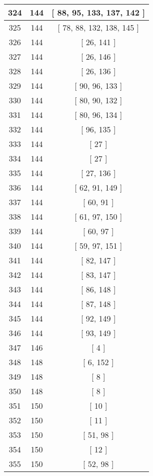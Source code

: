 \begin{center}
\begin{longtable}[H]{|| c c c ||}
\hline
324 & 144 & [ 88, 95, 133, 137, 142 ] \\ 
\hline
325 & 144 & [ 78, 88, 132, 138, 145 ] \\ 
\hline
326 & 144 & [ 26, 141 ] \\ 
\hline
327 & 144 & [ 26, 146 ] \\ 
\hline
328 & 144 & [ 26, 136 ] \\ 
\hline
329 & 144 & [ 90, 96, 133 ] \\ 
\hline
330 & 144 & [ 80, 90, 132 ] \\ 
\hline
331 & 144 & [ 80, 96, 134 ] \\ 
\hline
332 & 144 & [ 96, 135 ] \\ 
\hline
333 & 144 & [ 27 ] \\ 
\hline
334 & 144 & [ 27 ] \\ 
\hline
335 & 144 & [ 27, 136 ] \\ 
\hline
336 & 144 & [ 62, 91, 149 ] \\ 
\hline
337 & 144 & [ 60, 91 ] \\ 
\hline
338 & 144 & [ 61, 97, 150 ] \\ 
\hline
339 & 144 & [ 60, 97 ] \\ 
\hline
340 & 144 & [ 59, 97, 151 ] \\ 
\hline
341 & 144 & [ 82, 147 ] \\ 
\hline
342 & 144 & [ 83, 147 ] \\ 
\hline
343 & 144 & [ 86, 148 ] \\ 
\hline
344 & 144 & [ 87, 148 ] \\ 
\hline
345 & 144 & [ 92, 149 ] \\ 
\hline
346 & 144 & [ 93, 149 ] \\ 
\hline
347 & 146 & [ 4 ] \\ 
\hline
348 & 148 & [ 6, 152 ] \\ 
\hline
349 & 148 & [ 8 ] \\ 
\hline
350 & 148 & [ 8 ] \\ 
\hline
351 & 150 & [ 10 ] \\ 
\hline
352 & 150 & [ 11 ] \\ 
\hline
353 & 150 & [ 51, 98 ] \\ 
\hline
354 & 150 & [ 12 ] \\ 
\hline
355 & 150 & [ 52, 98 ] \\ 
\hline
\end{longtable}
\end{center}

